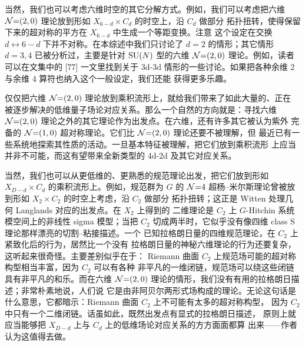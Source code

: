当然，我们也可以考虑六维时空的其它分解方式。例如，我们可以考虑把六维
$\mathcal{N}{=}(2,0)$ 理论放到形如 $X_{6-d}\times C_d$ 的时空上，沿 $C_d$ 做部分
拓扑扭转，使得保留下来的超对称的平方在 $X_{6-d}$ 中生成一个等距变换。注意
这个设定在交换 $d\leftrightarrow 6-d$ 下并不对称。在本综述中我们只讨论了
$d=2$ 的情形；其它情形 $d=3,4$ 已被分析过，主要是针对 $\mathrm{SU}(N)$ 型的六维
$\mathcal{N}{=}(2,0)$ 理论。例如，读者可以在文集中的 [77] 一文里找到关于 3d-3d
情形的一些讨论。如果把各种余维 2 与余维 4 算符也纳入这个一般设定，我们还能
获得更多乐趣。


仅仅把六维 $\mathcal{N}{=}(2,0)$ 理论放到乘积流形上，就给我们带来了如此大量的、正在
被逐步解决的低维量子场论对应关系。那么一个自然的方向就是：寻找六维
$\mathcal{N}{=}(2,0)$ 理论之外的其它理论作为出发点。在六维，还有许多其它被认为紫外
完备的 $\mathcal{N}{=}(1,0)$ 超对称理论。它们比 $\mathcal{N}{=}(2,0)$ 理论还要不被理解，但
最近已有一些系统地探索其性质的活动。一旦基本特征被理解，把它们放到乘积流形
上应当并非不可能，而这有望带来全新类型的 4d-2d 及其它对应关系。

当然，我们也可以从更低维的、更熟悉的规范理论出发，把它们放到形如
$X_{D-d}\times C_d$ 的乘积流形上。例如，规范群为 $G$ 的 $\mathcal{N}{=}4$
超杨--米尔斯理论曾被放到形如 $X_2\times C_2$ 的时空上考虑，沿 $C_2$ 做部分
拓扑扭转；这正是 Witten 处理几何 Langlands 对应的出发点。在 $X_2$ 上得到的
二维理论是 $C_2$ 上 $G$-Hitchin 系统模空间上的非线性 sigma 模型；当把 $C_2$
切成两半时，它似乎没有像四维 class S 理论那样漂亮的切割--粘接描述。一个
已知拉格朗日量的四维规范理论，在 $C_2$ 上紧致化后的行为，居然比一个没有
拉格朗日量的神秘六维理论的行为还要复杂，这听起来很奇怪。主要差别似乎在于：
Riemann 曲面 $C_2$ 上规范场可能的超对称构型相当丰富，因为 $C_2$ 可以有各种
非平凡的一维闭链，规范场可以绕这些闭链具有非平凡的和乐。而在六维
$\mathcal{N}{=}(2,0)$ 理论的情形，我们没有有用的拉格朗日描述；非常朴素地说，人们说
它是由非阿贝尔两形式场构成的理论。无论这句话是什么意思，它都暗示：Riemann
曲面 $C_2$ 上不可能有太多的超对称构型，%
因为 $C_2$ 中只有一个二维闭链。话虽如此，既然出发点有显式的拉格朗日描述，
原则上就应当能够把 $X_{D-d}$ 上与 $C_d$ 上的低维场论对应关系的方方面面都算
出来——作者认为这值得去做。

